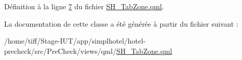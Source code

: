 Définition à la ligne \hyperlink{SH__TabZone_8qml_source_l00007}{7} du fichier \hyperlink{SH__TabZone_8qml_source}{S\-H\-\_\-\-Tab\-Zone.\-qml}.



La documentation de cette classe a été générée à partir du fichier suivant \-:\begin{DoxyCompactItemize}
\item 
/home/tiff/\-Stage-\/\-I\-U\-T/app/simplhotel/hotel-\/precheck/src/\-Pre\-Check/views/qml/\hyperlink{SH__TabZone_8qml}{S\-H\-\_\-\-Tab\-Zone.\-qml}\end{DoxyCompactItemize}
